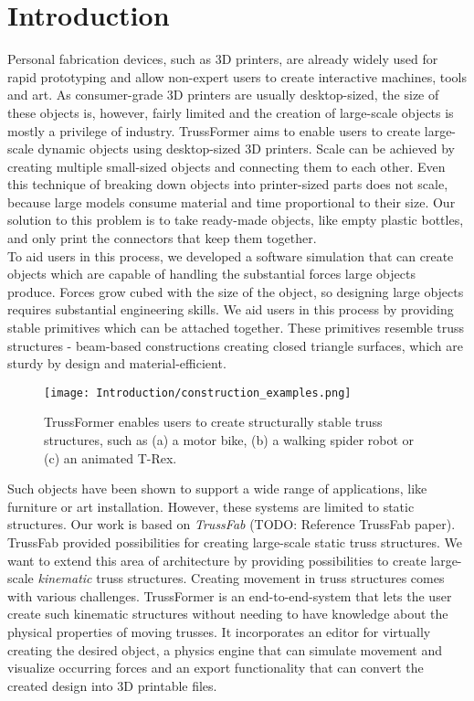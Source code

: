 \chapter{Introduction}\label{ch:introduction}
Personal fabrication devices, such as 3D printers, are already widely used for rapid prototyping and allow non-expert users to create interactive machines, tools and art. As consumer-grade 3D printers are usually desktop-sized, the size of these objects is, however, fairly limited and the creation of large-scale objects is mostly a privilege of industry. TrussFormer aims to enable users to create large-scale dynamic objects using desktop-sized 3D printers. Scale can be achieved by creating multiple small-sized objects and connecting them to each other. Even this technique of breaking down objects into printer-sized parts does not scale, because large models consume material and time proportional to their size. Our solution to this problem is to take ready-made objects, like empty plastic bottles, and only print the connectors that keep them together.\\
To aid users in this process, we developed a software simulation that can create objects which are capable of handling the substantial forces large objects produce. Forces grow cubed with the size of the object, so designing large objects requires substantial engineering skills. We aid users in this process by providing stable primitives which can be attached together. These primitives resemble truss structures - beam-based constructions creating closed triangle surfaces, which are sturdy by design and material-efficient.\\
\begin{figure}[h!]
    \texttt{[image: Introduction/construction\_examples.png]}
    \centering
    \caption{TrussFormer enables users to create structurally stable truss structures, such as (a) a motor bike, (b) a walking spider robot or (c) an animated T-Rex.}
    \label{fig:examples}
\end{figure}
Such objects have been shown to support a wide range of applications, like furniture or art installation. However, these systems are limited to static structures. Our work is based on \textit{TrussFab} (TODO: Reference TrussFab paper). TrussFab provided possibilities for creating large-scale static truss structures. We want to extend this area of architecture by providing possibilities to create large-scale \textit{kinematic} truss structures. Creating movement in truss structures comes with various challenges. TrussFormer is an end-to-end-system that lets the user create such kinematic structures without needing to have knowledge about the physical properties of moving trusses. It incorporates an editor for virtually creating the desired object, a physics engine that can simulate movement and visualize occurring forces and an export functionality that can convert the created design into 3D printable files.


